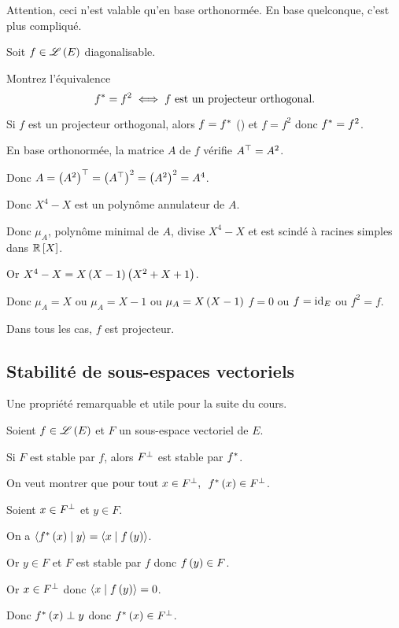 \begin{rem}
Attention, ceci n'est valable qu'en base orthonormée. En base quelconque, c'est plus compliqué.
\end{rem}

\begin{exo}
Soit \(f\in\mathscr{L}\left(E\right)\) diagonalisable.

Montrez l'équivalence \[f^*=f^2\iff f\text{ est un projecteur orthogonal}.\]
\end{exo}

\begin{corr}
\imprec Si \(f\) est un projecteur orthogonal, alors \(f=f^*\) (\cf {}) et \(f=f^2\) donc \(f^*=f^2\).

\impdir

En base orthonormée, la matrice \(A\) de \(f\) vérifie \(A^{\top}=A^2\).

Donc \(A=\left(A^2\right)^{\top}=\left(A^{\top}\right)^2=\left(A^2\right)^2=A^4\).

Donc \(X^4-X\) est un polynôme annulateur de \(A\).

Donc \(\mu_A\), polynôme minimal de \(A\), divise \(X^4-X\) et est scindé à racines simples dans \(\poly[\R]\).

Or \(X^4-X=X\left(X-1\right)\left(X^2+X+1\right)\).

Donc \(\mu_A=X\) ou \(\mu_A=X-1\) ou \(\mu_A=X\left(X-1\right)\) \ie \(f=0\) ou \(f=\mathrm{id}_{E}\) ou \(f^2=f\).

Dans tous les cas, \(f\) est projecteur.
\end{corr}

\subsection{Stabilité de sous-espaces vectoriels}

Une propriété remarquable et utile pour la suite du cours.

\begin{prop}
Soient \(f\in\mathscr{L}\left(E\right)\) et \(F\) un sous-espace vectoriel de \(E\).

Si \(F\) est stable par \(f\), alors \(F^{\perp}\) est stable par \(f^*\).
\end{prop}

\begin{dem}
On veut montrer que \(\quantifs{\tpt x\in F\ortho}f\adj\paren{x}\in F\ortho\).

Soient \(x\in F^{\perp}\) et \(y\in F\).

On a \(\ps{f\adj\paren{x}}{y}=\ps{x}{f\paren{y}}\).

Or \(y\in F\) et \(F\) est stable par \(f\) donc \(f\left(y\right)\in F\).

Or \(x\in F^{\perp}\) donc \(\ps{x}{f\paren{y}}=0\).

Donc \(f^*\left(x\right)\perp y\) donc \(f^*\left(x\right)\in F^{\perp}\).
\end{dem}

